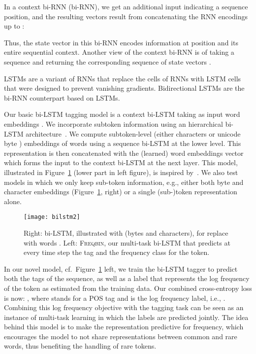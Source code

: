 \documentclass[11pt]{article}
\begin{document}
In a context bi-RNN (bi-RNN), we get an additional input  indicating a sequence position, and the resulting vectors  result from concatenating the RNN encodings up to : 

Thus, the state vector  in this bi-RNN encodes information 
at position  and its entire sequential context.
Another view of the context bi-RNN is of taking a sequence  and returning the corresponding sequence of state vectors .


LSTMs \cite{Hochreiter:Schmidhuber:97} are a variant of RNNs that replace the cells of RNNs
with LSTM cells that were designed to prevent vanishing gradients. 
Bidirectional LSTMs are the bi-RNN counterpart based on LSTMs.



Our basic bi-LSTM tagging model is a context bi-LSTM taking as input word embeddings . 
We incorporate subtoken information using an hierarchical bi-LSTM architecture~\cite{ling:ea:2015,ballesteros:ea:2015}. 
We compute subtoken-level (either characters  or unicode byte ) embeddings of words 
using a sequence bi-LSTM at the lower level. This representation is then concatenated with the (learned) word 
embeddings vector  which forms the input to the context bi-LSTM at the next layer. 
This model, illustrated in Figure~\ref{fig:bilstm} (lower part in left figure), is inspired by~. 
We also test models in which we only keep sub-token information, e.g., either both byte and character 
embeddings (Figure~\ref{fig:bilstm}, right) or a single (sub-)token representation alone. 

\begin{figure}[ht!]\centering
\texttt{[image: bilstm2]}
\caption{Right: bi-LSTM, illustrated with  (bytes and characters), for   replace  with words . Left: \textsc{Freqbin}, our multi-task bi-LSTM that predicts at every time step the tag and the frequency class for the token.}
\label{fig:bilstm}
\end{figure}

In our novel model, cf.\ Figure~\ref{fig:bilstm} left, we train the bi-LSTM tagger to predict both the tags of the sequence, as well as a label that represents the  log frequency of the token as estimated from the training data. Our combined cross-entropy loss is now: , where  stands for a POS tag and  is the log frequency label, i.e., .
 Combining this log frequency objective with the tagging task can be seen as an instance of multi-task learning in which the labels are predicted jointly. 
The idea behind this model is to make the representation predictive for frequency, which encourages the model to not share representations between common and rare words, thus benefiting the handling of rare tokens.
\end{document}
